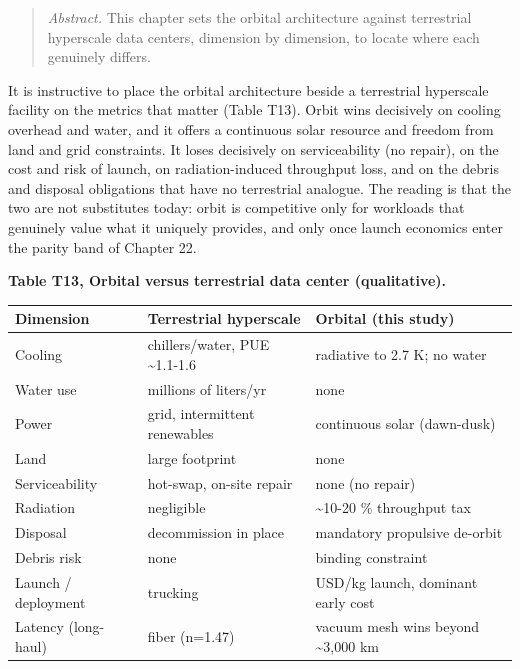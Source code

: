 \documentclass[
  11pt,
  openany,
  oneside]{book}
\newcounter{none} %
\begin{document}
\begin{quote}
\emph{Abstract.} This chapter sets the orbital architecture against
terrestrial hyperscale data centers, dimension by dimension, to locate
where each genuinely differs.
\end{quote}

It is instructive to place the orbital architecture beside a terrestrial
hyperscale facility on the metrics that matter (Table T13). Orbit wins
decisively on cooling overhead and water, and it offers a continuous
solar resource and freedom from land and grid constraints. It loses
decisively on serviceability (no repair), on the cost and risk of
launch, on radiation-induced throughput loss, and on the debris and
disposal obligations that have no terrestrial analogue. The reading is
that the two are not substitutes today: orbit is competitive only for
workloads that genuinely value what it uniquely provides, and only once
launch economics enter the parity band of Chapter 22.

\textbf{Table T13, Orbital versus terrestrial data center
(qualitative).}

{\def\LTcaptype{none} %
\begin{longtable}[]{@{}
  >{\raggedright\arraybackslash}p{}
  >{\raggedright\arraybackslash}p{}
  >{\raggedright\arraybackslash}p{}@{}}
\toprule\noalign{}
\begin{minipage}[b]{\linewidth}\raggedright
Dimension
\end{minipage} & \begin{minipage}[b]{\linewidth}\raggedright
Terrestrial hyperscale
\end{minipage} & \begin{minipage}[b]{\linewidth}\raggedright
Orbital (this study)
\end{minipage} \\
\midrule\noalign{}
\endhead
\bottomrule\noalign{}
\endlastfoot
Cooling & chillers/water, PUE \textasciitilde1.1-1.6 & radiative to 2.7
K; no water \\
Water use & millions of liters/yr & none \\
Power & grid, intermittent renewables & continuous solar (dawn-dusk) \\
Land & large footprint & none \\
Serviceability & hot-swap, on-site repair & none (no repair) \\
Radiation & negligible & \textasciitilde10-20 \% throughput tax \\
Disposal & decommission in place & mandatory propulsive de-orbit \\
Debris risk & none & binding constraint \\
Launch / deployment & trucking & USD/kg launch, dominant early cost \\
Latency (long-haul) & fiber (n=1.47) & vacuum mesh wins beyond
\textasciitilde3,000 km \\
\end{longtable}
}
\end{document}
